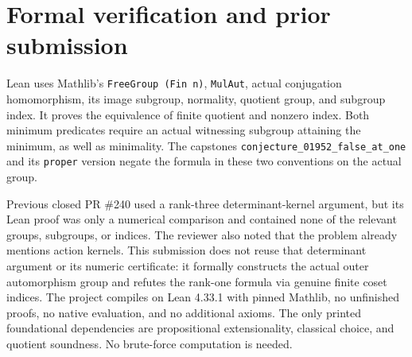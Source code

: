 \documentclass[10pt]{article}
\begin{document}
\section*{Formal verification and prior submission}
Lean uses Mathlib's \texttt{FreeGroup (Fin n)}, \texttt{MulAut}, actual
conjugation homomorphism, its image subgroup, normality, quotient group,
and subgroup index. It proves the equivalence of finite quotient and
nonzero index. Both minimum predicates require an actual witnessing
subgroup attaining the minimum, as well as minimality. The capstones
\texttt{conjecture\_01952\_false\_at\_one} and its \texttt{proper} version
negate the formula in these two conventions on the actual group.

Previous closed PR \#240 used a rank-three determinant-kernel argument,
but its Lean proof was only a numerical comparison and contained none of
the relevant groups, subgroups, or indices. The reviewer also noted that
the problem already mentions action kernels. This submission does not
reuse that determinant argument or its numeric certificate: it formally
constructs the actual outer automorphism group and refutes the rank-one
formula via genuine finite coset indices.
The project compiles on Lean 4.33.1 with pinned Mathlib, no unfinished
proofs, no native evaluation, and no additional axioms. The only printed
foundational dependencies are propositional extensionality, classical
choice, and quotient soundness. No brute-force computation is needed.
\end{document}
